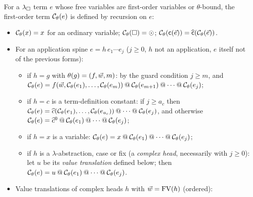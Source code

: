 \begin{definition}
\label{def:compC}
For a $\lambda_{\square}$ term $e$ whose free variables are first-order variables or
$\theta$-bound, the first-order term $\mathcal{C}_\theta(e)$ is defined by
recursion on $e$:
\begin{itemize}[leftmargin=2em]
\item $\mathcal{C}_\theta(x) = x$ for an ordinary variable;
  $\mathcal{C}_\theta(\square) = \odot$;
  $\mathcal{C}_\theta(\mathsf{c}(\vec{e})) =
    \widehat{\mathsf{c}}(\mathcal{C}_\theta(\vec{e}))$.
\item For an application spine $e = h\,e_1 \cdots e_j$ ($j \geq 0$, $h$
  not an application, $e$ itself not of the previous forms):
  \begin{itemize}
  \item if $h = g$ with $\theta(g) = (f, \vec{w}, m)$: by the guard
    condition $j \geq m$, and
    $\mathcal{C}_\theta(e) = f(\vec{w}, \mathcal{C}_\theta(e_1), \dots,
    \mathcal{C}_\theta(e_m)) \mathbin{@} \mathcal{C}_\theta(e_{m+1}) \mathbin{@} \cdots \mathbin{@}
    \mathcal{C}_\theta(e_j)$;
  \item if $h = c$ is a term-definition constant: if $j \geq a_c$ then
    $\mathcal{C}_\theta(e) = \widehat{c}(\mathcal{C}_\theta(e_1), \dots,
    \mathcal{C}_\theta(e_{a_c})) \mathbin{@} \cdots \mathbin{@} \mathcal{C}_\theta(e_j)$, and
    otherwise $\mathcal{C}_\theta(e) = \widehat{c}^0 \mathbin{@} \mathcal{C}_\theta(e_1)
    \mathbin{@} \cdots \mathbin{@} \mathcal{C}_\theta(e_j)$;
  \item if $h = x$ is a variable: $\mathcal{C}_\theta(e) = x \mathbin{@}
    \mathcal{C}_\theta(e_1) \mathbin{@} \cdots \mathbin{@} \mathcal{C}_\theta(e_j)$;
  \item if $h$ is a $\lambda$-abstraction, case or fix (a \emph{complex
    head}, necessarily with $j \geq 0$): let $u$ be its \emph{value
    translation} defined below; then $\mathcal{C}_\theta(e) = u \mathbin{@}
    \mathcal{C}_\theta(e_1) \mathbin{@} \cdots \mathbin{@} \mathcal{C}_\theta(e_j)$.
  \end{itemize}
\item Value translations of complex heads $h$ with $\vec{w} =
  \mathrm{FV}(h)$ (ordered):
\end{itemize}
\end{definition}
